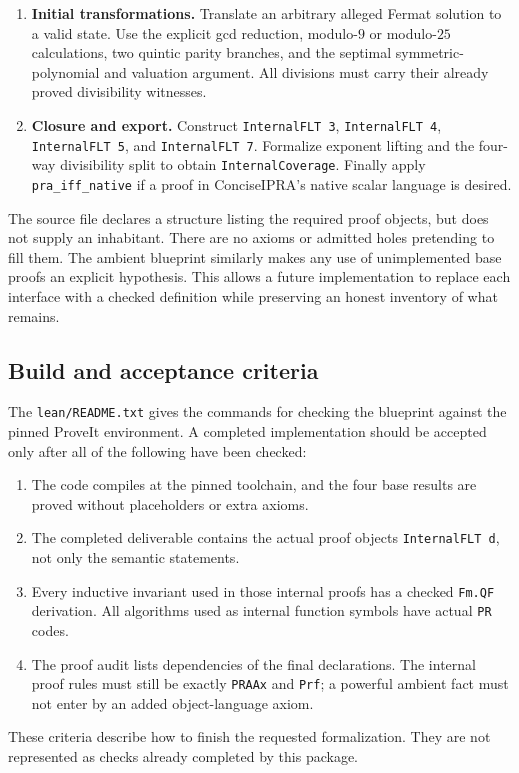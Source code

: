 \begin{enumerate}
\item \textbf{Initial transformations.} Translate an arbitrary alleged
Fermat solution to a valid state. Use the explicit gcd reduction,
modulo-$9$ or modulo-$25$ calculations, two quintic parity branches,
and the septimal symmetric-polynomial and valuation argument. All
divisions must carry their already proved divisibility witnesses.

\item \textbf{Closure and export.} Construct \texttt{InternalFLT 3},
\texttt{InternalFLT 4}, \texttt{InternalFLT 5}, and \texttt{InternalFLT 7}.
Formalize exponent lifting and the four-way divisibility split to obtain
\texttt{InternalCoverage}. Finally apply \texttt{pra\_iff\_native} if a
proof in ConciseIPRA's native scalar language is desired.
\end{enumerate}

The source file declares a structure listing the required proof objects,
but does not supply an inhabitant. There are no axioms or admitted holes
pretending to fill them. The ambient blueprint similarly makes any use
of unimplemented base proofs an explicit hypothesis. This allows a future
implementation to replace each interface with a checked definition while
preserving an honest inventory of what remains.

\subsection{Build and acceptance criteria}

The \texttt{lean/README.txt} gives the commands for checking the blueprint
against the pinned ProveIt environment. A completed implementation should
be accepted only after all of the following have been checked:
\begin{enumerate}
\item The code compiles at the pinned toolchain, and the four base results
are proved without placeholders or extra axioms.
\item The completed deliverable contains the actual proof objects
\texttt{InternalFLT d}, not only the semantic statements.
\item Every inductive invariant used in those internal proofs has a
checked \texttt{Fm.QF} derivation. All algorithms used as internal
function symbols have actual \texttt{PR} codes.
\item The proof audit lists dependencies of the final declarations.
The internal proof rules must still be exactly \texttt{PRAAx} and
\texttt{Prf}; a powerful ambient fact must not enter by an added
object-language axiom.
\end{enumerate}
These criteria describe how to finish the requested formalization. They
are not represented as checks already completed by this package.

